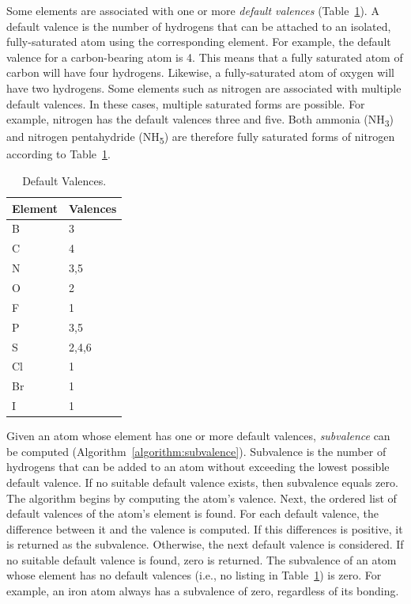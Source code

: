 \documentclass{article}
\begin{document}
Some elements are associated with one or more \textit{default valences} (Table~\ref{table:default-valences}). A default valence is the number of hydrogens that can be attached to an isolated, fully-saturated atom using the corresponding element. For example, the default valence for a carbon-bearing atom is 4. This means that a fully saturated atom of carbon will have four hydrogens. Likewise, a fully-saturated atom of oxygen will have two hydrogens. Some elements such as nitrogen are associated with multiple default valences. In these cases, multiple saturated forms are possible. For example, nitrogen has the default valences three and five. Both ammonia (NH\textsubscript{3}) and nitrogen pentahydride (NH\textsubscript{5}) are therefore fully saturated forms of nitrogen according to Table~\ref{table:default-valences}.

\begin{table}
    \caption{Default Valences.}
    \centering
    \begin{tabular}{l l}
        \hline
        Element & Valences \\
        \hline
        B & 3 \\
        C & 4 \\
        N & 3,5 \\
        O & 2 \\
        F & 1 \\
        P & 3,5 \\
        S & 2,4,6 \\
        Cl & 1 \\
        Br & 1 \\
        I & 1 \\
        \hline
    \end{tabular}
    \label{table:default-valences}
\end{table}

Given an atom whose element has one or more default valences, \textit{subvalence} can be computed (Algorithm~\ref{algorithm:subvalence}). Subvalence is the number of hydrogens that can be added to an atom without exceeding the lowest possible default valence. If no suitable default valence exists, then subvalence equals zero. The algorithm begins by computing the atom's valence. Next, the ordered list of default valences of the atom's element is found. For each default valence, the difference between it and the valence is computed. If this differences is positive, it is returned as the subvalence. Otherwise, the next default valence is considered. If no suitable default valence is found, zero is returned. The subvalence of an atom whose element has no default valences (i.e., no listing in Table~\ref{table:default-valences}) is zero. For example, an iron atom always has a subvalence of zero, regardless of its bonding.
\end{document}
